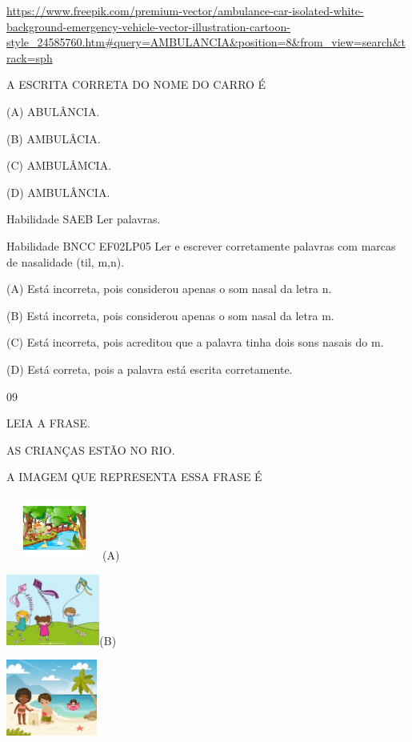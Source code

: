 {{{{{{\url{https://www.freepik.com/premium-vector/ambulance-car-isolated-white-background-emergency-vehicle-vector-illustration-cartoon-style_24585760.htm\#query=AMBULANCIA\&position=8\&from_view=search\&track=sph}

A ESCRITA CORRETA DO NOME DO CARRO É

(A) ABULÂNCIA.

(B) AMBULÂCIA.

(C) AMBULÂMCIA.

(D) AMBULÂNCIA.

\protect\hypertarget{_Hlk129375149}{}{}Habilidade SAEB Ler palavras.

Habilidade BNCC EF02LP05 Ler e escrever corretamente palavras com marcas
de nasalidade (til, m,n).

\protect\hypertarget{_Hlk129358521}{}{}(A) Está incorreta, pois
considerou apenas o som nasal da letra n.

(B) Está incorreta, pois considerou apenas o som nasal da letra m.

(C) Está incorreta, pois acreditou que a palavra tinha dois sons nasais
do m.

(D) Está correta, pois a palavra está escrita corretamente.

\num{09}

LEIA A FRASE.

AS CRIANÇAS ESTÃO NO RIO.

A IMAGEM QUE REPRESENTA ESSA FRASE É

\includegraphics[width=1.25000in,height=0.82361in]{media/image154.jpeg}(A)

\includegraphics[width=1.21181in,height=0.92014in]{media/image155.jpeg}(B)

\includegraphics[width=1.18125in,height=0.98472in]{media/image156.jpeg}

}}}}}}
